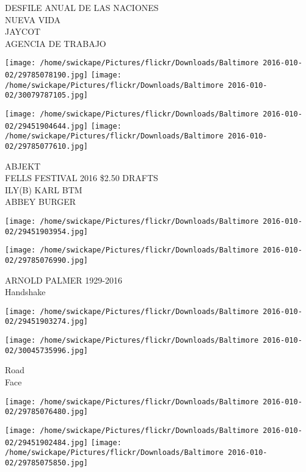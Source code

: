 \documentclass[10pt,letterpaper]{article}
\begin{document}
DESFILE ANUAL DE LAS NACIONES\\
NUEVA VIDA\\
JAYCOT\\
AGENCIA DE TRABAJO\\
\pagebreak

\texttt{[image: /home/swickape/Pictures/flickr/Downloads/Baltimore 2016-010-02/29785078190.jpg]}
\texttt{[image: /home/swickape/Pictures/flickr/Downloads/Baltimore 2016-010-02/30079787105.jpg]}

\texttt{[image: /home/swickape/Pictures/flickr/Downloads/Baltimore 2016-010-02/29451904644.jpg]}
\texttt{[image: /home/swickape/Pictures/flickr/Downloads/Baltimore 2016-010-02/29785077610.jpg]}

ABJEKT\\
FELLS FESTIVAL 2016 \$2.50 DRAFTS\\
ILY(B) KARL BTM\\
ABBEY BURGER\\
\pagebreak

\texttt{[image: /home/swickape/Pictures/flickr/Downloads/Baltimore 2016-010-02/29451903954.jpg]}

\vspace{0.25in}
\texttt{[image: /home/swickape/Pictures/flickr/Downloads/Baltimore 2016-010-02/29785076990.jpg]}

ARNOLD PALMER 1929{-}2016\\
Handshake\\
\pagebreak

\texttt{[image: /home/swickape/Pictures/flickr/Downloads/Baltimore 2016-010-02/29451903274.jpg]}

\vspace{0.25in}
\texttt{[image: /home/swickape/Pictures/flickr/Downloads/Baltimore 2016-010-02/30045735996.jpg]}

Road\\
Face\\
\pagebreak

\texttt{[image: /home/swickape/Pictures/flickr/Downloads/Baltimore 2016-010-02/29785076480.jpg]}

\vspace{0.25in}
\texttt{[image: /home/swickape/Pictures/flickr/Downloads/Baltimore 2016-010-02/29451902484.jpg]}
\texttt{[image: /home/swickape/Pictures/flickr/Downloads/Baltimore 2016-010-02/29785075850.jpg]}
\end{document}
